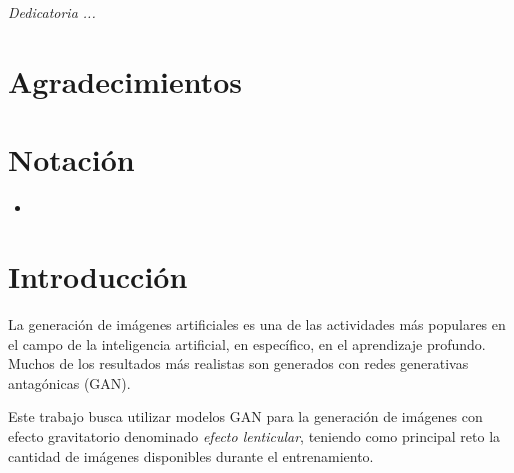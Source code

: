 \documentclass[letterpaper,12pt,oneside]{book}
\begin{document}
                \vspace{0.5cm}
                
            
        
        \chapter*{}
            \begin{flushright}%
                \emph{Dedicatoria ...}                        
                \thispagestyle{empty}
            \end{flushright}
            
       
        \chapter{Agradecimientos}
                
       
        \chapter{Notación}
            \begin{itemize}
                \item 
            \end{itemize}

        \newpage
        \tableofcontents
        \newpage
        \listoffigures

        \mainmatter

       
        \chapter{Introducción}
            La generación de imágenes artificiales es una de las actividades más populares en el campo de la inteligencia artificial, en específico, en el aprendizaje profundo. Muchos de los resultados más realistas son generados con redes generativas antagónicas (GAN). 

            Este trabajo busca utilizar modelos GAN para la generación de imágenes con efecto gravitatorio denominado {\it efecto lenticular}, teniendo como principal reto la cantidad de imágenes disponibles durante el entrenamiento.
\end{document}
